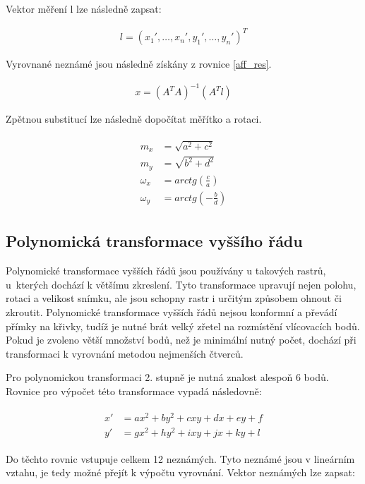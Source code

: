 \documentclass[thesis=M,czech]{FITthesis}[2012/06/26]
\begin{document}
Vektor měření l lze následně zapsat:

\begin{align} \label{aff_l}
l = (x_1', \ldots , x_n', y_1', \ldots , y_n')^T
\end{align}

Vyrovnané neznámé jsou následně získány z rovnice \eqref{aff_res}.

\begin{align} \label{aff_res}
x = (A^TA)^{-1} (A^Tl)
\end{align}

Zpětnou substitucí lze následně dopočítat měřítko a rotaci.

\begin{align} \label{aff_vysledek}
\begin{split}
m_x &= \sqrt{a^2 + c^2} \\
m_y &= \sqrt{b^2 + d^2} \\
\omega_x &= arctg(\frac{c}{a}) \\
\omega_y &= arctg(-\frac{b}{d}) 
\end{split}
\end{align}

\subsection{Polynomická transformace vyššího řádu}
Polynomické transformace vyšších řádů jsou používány u takových rastrů, u~kterých dochází k většímu zkreslení. Tyto transformace upravují nejen polohu, rotaci a velikost snímku, ale jsou schopny rastr i určitým způsobem ohnout či zkroutit. Polynomické transformace vyšších řádů nejsou konformní a převádí přímky na křivky, tudíž je nutné brát velký zřetel na rozmístění vlícovacích bodů. Pokud je zvoleno větší množství bodů, než je minimální nutný počet, dochází při transformaci k vyrovnání metodou nejmenších čtverců. 

Pro polynomickou transformaci 2. stupně je nutná znalost alespoň 6 bodů. Rovnice pro výpočet této transformace vypadá následovně:

\begin{align} \label{poly_2}
\begin{split}
x' &= ax^2 + by^2 + cxy + dx + ey + f \\
y' &= gx^2 + hy^2 + ixy +jx + ky +l 
\end{split}
\end{align}

Do těchto rovnic vstupuje celkem 12 neznámých. Tyto neznámé jsou v lineárním vztahu, je tedy možné přejít k výpočtu vyrovnání. Vektor neznámých lze zapsat:
\end{document}
